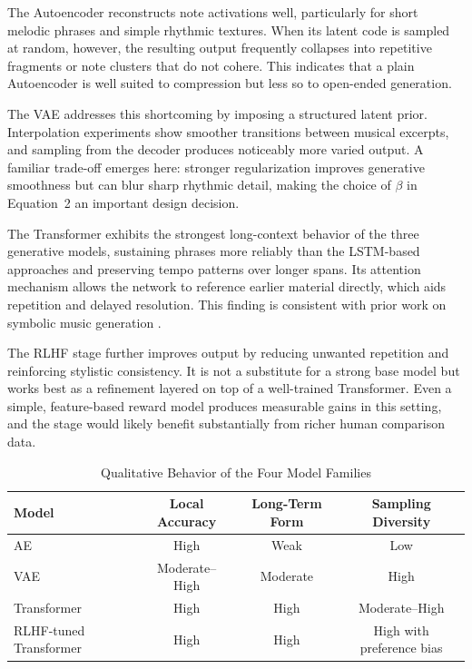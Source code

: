 \documentclass[conference]{IEEEtran}
\begin{document}
The Autoencoder reconstructs note activations well, particularly for short melodic phrases and simple rhythmic textures. When its latent code is sampled at random, however, the resulting output frequently collapses into repetitive fragments or note clusters that do not cohere. This indicates that a plain Autoencoder is well suited to compression but less so to open-ended generation.

The VAE addresses this shortcoming by imposing a structured latent prior. Interpolation experiments show smoother transitions between musical excerpts, and sampling from the decoder produces noticeably more varied output. A familiar trade-off emerges here: stronger regularization improves generative smoothness but can blur sharp rhythmic detail, making the choice of $\beta$ in Equation~2 an important design decision.

The Transformer exhibits the strongest long-context behavior of the three generative models, sustaining phrases more reliably than the LSTM-based approaches and preserving tempo patterns over longer spans. Its attention mechanism allows the network to reference earlier material directly, which aids repetition and delayed resolution. This finding is consistent with prior work on symbolic music generation \cite{musictransformer}.

The RLHF stage further improves output by reducing unwanted repetition and reinforcing stylistic consistency. It is not a substitute for a strong base model but works best as a refinement layered on top of a well-trained Transformer. Even a simple, feature-based reward model produces measurable gains in this setting, and the stage would likely benefit substantially from richer human comparison data.

\begin{table}[ht]
\centering
\caption{Qualitative Behavior of the Four Model Families}
\begin{tabular}{|l|c|c|c|}
\hline
\textbf{Model} & \textbf{Local Accuracy} & \textbf{Long-Term Form} & \textbf{Sampling Diversity} \\ \hline
AE & High & Weak & Low \\ \hline
VAE & Moderate--High & Moderate & High \\ \hline
Transformer & High & High & Moderate--High \\ \hline
RLHF-tuned Transformer & High & High & High with preference bias \\ \hline
\end{tabular}
\end{table}
\end{document}
